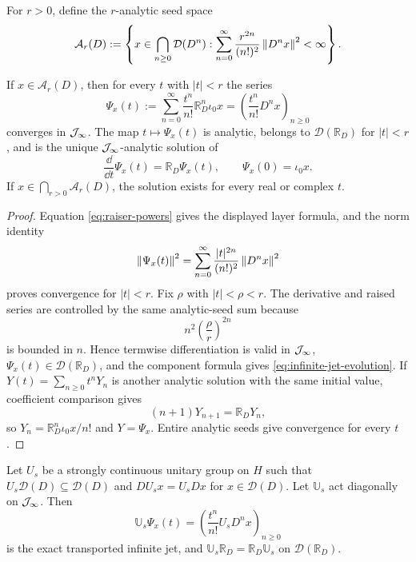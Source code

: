For $r>0$, define the $r$-analytic seed space
\begin{equation}
\mathcal A_r(D)
:=\left\{x\in\bigcap_{n\ge0}\mathcal D(D^n):
\sum_{n=0}^\infty
\frac{r^{2n}}{(n!)^2}\left\lVert D^nx\right\rVert^2<\infty\right\}.
\label{eq:analytic-seed-space}
\end{equation}

\begin{theorem}
If $x\in\mathcal A_r(D)$, then for every $t$ with $|t|<r$ the series
\begin{equation}
\Psi_x(t)
:=\sum_{n=0}^\infty\frac{t^n}{n!}
\mathbb R_D^n\iota_0x
=\left(\frac{t^n}{n!}D^nx\right)_{n\ge0}
\label{eq:analytic-infinite-jet}
\end{equation}
converges in $\mathcal J_\infty$.  The map $t\mapsto\Psi_x(t)$ is analytic, belongs to $\mathcal D(\mathbb R_D)$ for $|t|<r$, and is the unique $\mathcal J_\infty$-analytic solution of
\begin{equation}
\frac{\dd}{\dd t}\Psi_x(t)
=\mathbb R_D\Psi_x(t),
\qquad
\Psi_x(0)=\iota_0x.
\label{eq:infinite-jet-evolution}
\end{equation}
If $x\in\bigcap_{r>0}\mathcal A_r(D)$, the solution exists for every real or complex $t$.
\end{theorem}

\begin{proof}
Equation \eqref{eq:raiser-powers} gives the displayed layer formula, and the norm identity
\[
\left\lVert\Psi_x(t)\right\rVert^2
=\sum_{n=0}^\infty
\frac{|t|^{2n}}{(n!)^2}\left\lVert D^nx\right\rVert^2
\]
proves convergence for $|t|<r$.  Fix $\rho$ with $|t|<\rho<r$.  The derivative and raised series are controlled by the same analytic-seed sum because
\[
n^2\left(\frac{\rho}{r}\right)^{2n}
\]
is bounded in $n$.  Hence termwise differentiation is valid in $\mathcal J_\infty$, $\Psi_x(t)\in\mathcal D(\mathbb R_D)$, and the component formula gives \eqref{eq:infinite-jet-evolution}.  If $Y(t)=\sum_{n\ge0}t^nY_n$ is another analytic solution with the same initial value, coefficient comparison gives
\[
(n+1)Y_{n+1}=\mathbb R_DY_n,
\]
so $Y_n=\mathbb R_D^n\iota_0x/n!$ and $Y=\Psi_x$.  Entire analytic seeds give convergence for every $t$.
\end{proof}

\begin{corollary}
Let $U_s$ be a strongly continuous unitary group on $H$ such that $U_s\mathcal D(D)\subseteq\mathcal D(D)$ and $DU_sx=U_sDx$ for $x\in\mathcal D(D)$.  Let $\mathbb U_s$ act diagonally on $\mathcal J_\infty$.  Then
\begin{equation}
\mathbb U_s\Psi_x(t)
=\left(\frac{t^n}{n!}U_sD^nx\right)_{n\ge0}
\label{eq:transported-infinite-jet}
\end{equation}
is the exact transported infinite jet, and $\mathbb U_s\mathbb R_D=\mathbb R_D\mathbb U_s$ on $\mathcal D(\mathbb R_D)$.
\end{corollary}

